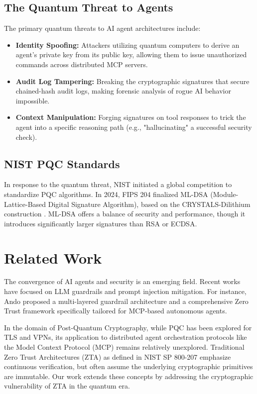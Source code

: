 \documentclass[conference]{IEEEtran}
\begin{document}
\subsection{The Quantum Threat to Agents}
The primary quantum threats to AI agent architectures include:
\begin{itemize}
    \item \textbf{Identity Spoofing:} Attackers utilizing quantum computers to derive an agent's private key from its public key, allowing them to issue unauthorized commands across distributed MCP servers.
    \item \textbf{Audit Log Tampering:} Breaking the cryptographic signatures that secure chained-hash audit logs, making forensic analysis of rogue AI behavior impossible.
    \item \textbf{Context Manipulation:} Forging signatures on tool responses to trick the agent into a specific reasoning path (e.g., "hallucinating" a successful security check).
\end{itemize}

\subsection{NIST PQC Standards}
In response to the quantum threat, NIST initiated a global competition to standardize PQC algorithms. In 2024, FIPS 204 finalized ML-DSA (Module-Lattice-Based Digital Signature Algorithm), based on the CRYSTALS-Dilithium construction \cite{mldsa2023}. ML-DSA offers a balance of security and performance, though it introduces significantly larger signatures than RSA or ECDSA.

\section{Related Work}
The convergence of AI agents and security is an emerging field. Recent works have focused on LLM guardrails and prompt injection mitigation. For instance, Ando proposed a multi-layered guardrail architecture \cite{ando2026guardrails} and a comprehensive Zero Trust framework \cite{ando2026zerotrust} specifically tailored for MCP-based autonomous agents. 

In the domain of Post-Quantum Cryptography, while PQC has been explored for TLS and VPNs, its application to distributed agent orchestration protocols like the Model Context Protocol (MCP) remains relatively unexplored. Traditional Zero Trust Architectures (ZTA) as defined in NIST SP 800-207 \cite{nist800207} emphasize continuous verification, but often assume the underlying cryptographic primitives are immutable. Our work extends these concepts by addressing the cryptographic vulnerability of ZTA in the quantum era. 
\end{document}
